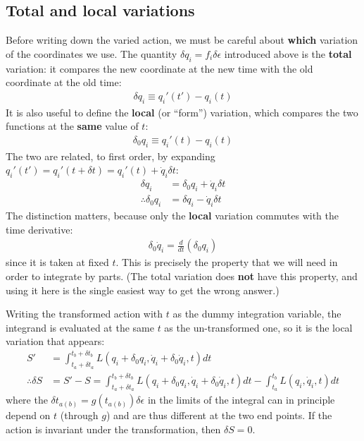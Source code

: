 \subsection{Total and local variations}
Before writing down the varied action, we must be careful about \textbf{which} variation of the coordinates we use. The quantity $\delta q_i=f_i\delta\epsilon$ introduced above is the \textbf{total} variation: it compares the new coordinate at the new time with the old coordinate at the old time:
\begin{align}
\delta q_i \equiv q_i'(t')-q_i(t)
\end{align}
It is also useful to define the \textbf{local} (or ``form'') variation, which compares the two functions at the \textbf{same} value of $t$:
\begin{align}
\delta_0 q_i \equiv q_i'(t)-q_i(t)
\end{align}
The two are related, to first order, by expanding $q_i'(t')=q_i'(t+\delta t)=q_i'(t)+\dot{q}_i\delta t$:
\begin{align}
\delta q_i&=\delta_0 q_i+\dot{q}_i\delta t\nonumber\\
\therefore \delta_0 q_i&=\delta q_i-\dot{q}_i\delta t
\label{eqn:localvar}
\end{align}
The distinction matters, because only the \textbf{local} variation commutes with the time derivative:
\begin{align}
\delta_0 \dot{q}_i = \frac{d}{dt}\left(\delta_0 q_i\right)
\label{eqn:localcommute}
\end{align}
since it is taken at fixed $t$. This is precisely the property that we will need in order to integrate by parts. (The total variation does \textbf{not} have this property, and using it here is the single easiest way to get the wrong answer.)

Writing the transformed action with $t$ as the dummy integration variable, the integrand is evaluated at the same $t$ as the un-transformed one, so it is the local variation that appears:
\begin{align}
S'&=\int_{t_a+\delta t_a}^{t_b+\delta t_b} L(q_i+\delta_0 q_i, \dot{q}_i+\delta_0\dot{q}_i,t)dt\nonumber\\
\therefore \delta S&=S'-S=\int_{t_a+\delta t_a}^{t_b+\delta t_b} L(q_i+\delta_0 q_i, \dot{q}_i+\delta_0\dot{q}_i,t)dt-\int_{t_a}^{t_b}L(q_i,\dot{q}_i,t)dt
\end{align}
where the $\delta t_{a(b)}=g(t_{a(b)}) \delta \epsilon$ in the limits of the integral can in principle depend on $t$ (through $g$) and are thus different at the two end points. If the action is invariant under the transformation, then $\delta S=0$.


